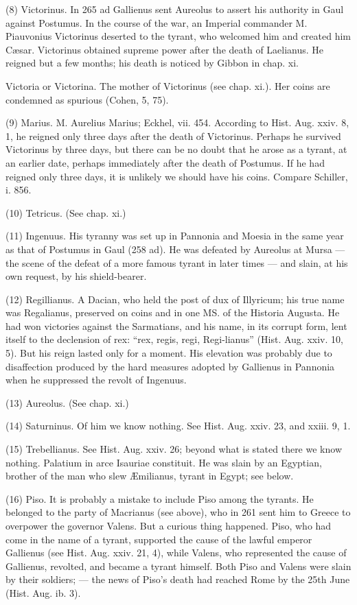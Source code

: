 (8) Victorinus. In 265 ad Gallienus sent Aureolus to assert his authority in Gaul against Postumus. In the course of the war, an Imperial commander M. Piauvonius Victorinus deserted to the tyrant, who welcomed him and created him Cæsar. Victorinus obtained supreme power after the death of Laelianus. He reigned but a few months; his death is noticed by Gibbon in chap. xi.

Victoria or Victorina. The mother of Victorinus (see chap. xi.). Her coins are condemned as spurious (Cohen, 5, 75).

(9) Marius. M. Aurelius Marius; Eckhel, vii. 454. According to Hist. Aug. xxiv. 8, 1, he reigned only three days after the death of Victorinus. Perhaps he survived Victorinus by three days, but there can be no doubt that he arose as a tyrant, at an earlier date, perhaps immediately after the death of Postumus. If he had reigned only three days, it is unlikely we should have his coins. Compare Schiller, i. 856.

(10) Tetricus. (See chap. xi.)

(11) Ingenuus. His tyranny was set up in Pannonia and Moesia in the same year as that of Postumus in Gaul (258 ad). He was defeated by Aureolus at Mursa \texthebrew{—} the scene of the defeat of a more famous tyrant in later times \texthebrew{—} and slain, at his own request, by his shield-bearer.

(12) Regillianus. A Dacian, who held the post of dux of Illyricum; his true name was Regalianus, preserved on coins and in one MS. of the Historia Augusta. He had won victories against the Sarmatians, and his name, in its corrupt form, lent itself to the declension of rex: \texthebrew{“}rex, regis, regi, Regi-lianus\texthebrew{}” (Hist. Aug. xxiv. 10, 5). But his reign lasted only for a moment. His elevation was probably due to disaffection produced by the hard measures adopted by Gallienus in Pannonia when he suppressed the revolt of Ingenuus.

(13) Aureolus. (See chap. xi.)

(14) Saturninus. Of him we know nothing. See Hist. Aug. xxiv. 23, and xxiii. 9, 1.

(15) Trebellianus. See Hist. Aug. xxiv. 26; beyond what is stated there we know nothing. Palatium in arce Isauriae constituit. He was slain by an Egyptian, brother of the man who slew Æmilianus, tyrant in Egypt; see below.

(16) Piso. It is probably a mistake to include Piso among the tyrants. He belonged to the party of Macrianus (see above), who in 261 sent him to Greece to overpower the governor Valens. But a curious thing happened. Piso, who had come in the name of a tyrant, supported the cause of the lawful emperor Gallienus (see Hist. Aug. xxiv. 21, 4), while Valens, who represented the cause of Gallienus, revolted, and became a tyrant himself. Both Piso and Valens were slain by their soldiers; \texthebrew{—} the news of Piso\texthebrew{}’s death had reached Rome by the 25th June (Hist. Aug. ib. 3).

